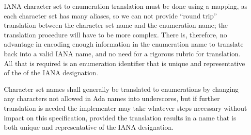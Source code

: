 \documentclass[11pt]{article}
\begin{document}
IANA character set to enumeration translation must be done using a
mapping, as each character set has many aliases, so we can not provide
``round trip'' translation between the character set name and the
enumeration name; the translation procedure will have to be more
complex. There is, therefore, no advantage in encoding enough
information in the enumeration name to translate back into a valid
IANA name, and no need for a rigorous rubric for translation. All that
is required is an enumeration identifier that is unique and
representative of the of the IANA designation.

Character set names shall generally be translated to enumerations by
changing any characters not allowed in Ada names into underscores, but
if further translation is needed the implementer may take whatever
steps necessary without impact on this specification, provided the
translation results in a name that is both unique and representative
of the IANA designation. 
\end{document}
